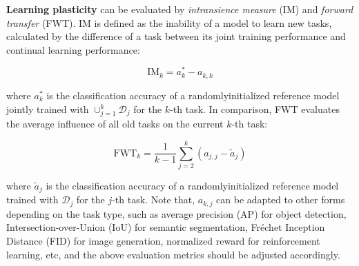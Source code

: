 \documentclass[9pt,dvipsnames]{beamer}
\begin{document}
\begin{frame}
    \textbf{Learning plasticity} can be evaluated by \textit{intransience measure} (IM) and \textit{forward transfer} (FWT). IM is defined as the inability of a model to learn new tasks, calculated by the difference of a task between its joint training performance and continual learning performance:

    $$
        \mathrm{IM}_{k}=a_{k}^{*}-a_{k, k}
    $$

    where $a_{k}^{*}$ is the classification accuracy of a randomlyinitialized reference model jointly trained with $\cup_{j=1}^{k} \mathcal{D}_{j}$ for the $k$-th task. In comparison, FWT evaluates the average influence of all old tasks on the current $k$-th task:

    $$
        \mathrm{FWT}_{k}=\frac{1}{k-1} \sum_{j=2}^{k}\left(a_{j, j}-\tilde{a}_{j}\right)
    $$

    where $\tilde{a}_{j}$ is the classification accuracy of a randomlyinitialized reference model trained with $\mathcal{D}_{j}$ for the $j$-th task. Note that, $a_{k, j}$ can be adapted to other forms depending on the task type, such as average precision (AP) for object detection, Intersection-over-Union (IoU) for semantic segmentation, Fréchet Inception Distance (FID) for image generation, normalized reward for reinforcement learning, etc, and the above evaluation metrics should be adjusted accordingly.
\end{frame}
\end{document}
